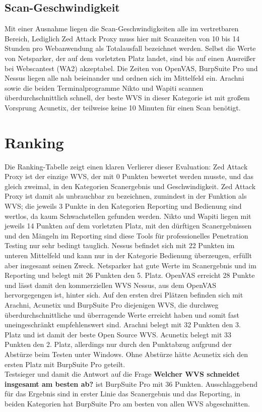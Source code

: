 \documentclass[12pt,oneside,a4paper,parskip]{scrbook}
\begin{document}
  \subsection{Scan-Geschwindigkeit}
  Mit einer Ausnahme liegen die Scan-Geschwindigkeiten alle im vertretbaren Bereich, Lediglich Zed Attack Proxy muss hier mit Scanzeiten von 10 bis 14 Stunden pro Webanwendung als Totalausfall bezeichnet werden. Selbst die Werte von Netsparker, der auf dem vorletzten Platz landet, sind bis auf einen Ausreißer bei Webscantest (WA2) akzeptabel. Die Zeiten von OpenVAS, BurpSuite Pro und Nessus liegen alle nah beieinander und ordnen sich im Mittelfeld ein. Arachni sowie die beiden Terminalprogramme Nikto und Wapiti scannen überdurchschnittlich schnell, der beste WVS in dieser Kategorie ist mit großem Vorsprung Acunetix, der teilweise keine 10 Minuten für einen Scan benötigt.
  \section{Ranking}
  Die Ranking-Tabelle zeigt einen klaren Verlierer dieser Evaluation: Zed Attack Proxy ist der einzige WVS, der mit 0 Punkten bewertet werden musste, und das gleich zweimal, in den Kategorien Scanergebnis und Geschwindigkeit. Zed Attack Proxy ist damit als unbrauchbar zu bezeichnen, zumindest in der Funktion als WVS; die jeweils 3 Punkte in den Kategorien Reporting und Bedienung sind wertlos, da kaum Schwachstellen gefunden werden. Nikto und Wapiti liegen mit jeweils 14 Punkten auf dem vorletzten Platz, mit den dürftigen Scanergebnissen und den Mängeln im Reporting sind diese Tools für professionelles Penetration Testing nur sehr bedingt tauglich. Nessus befindet sich mit 22 Punkten im unteren Mittelfeld und kann nur in der Kategorie Bedienung überzeugen, erfüllt aber insgesamt seinen Zweck. Netsparker hat gute Werte im Scanergebnis und im Reporting und belegt mit 26 Punkten den 5. Platz. OpenVAS erreicht 28 Punkte und lässt damit den kommerziellen WVS Nessus, aus dem OpenVAS hervorgegengen ist, hinter sich.
  Auf den ersten drei Plätzen befinden sich mit Arachni, Acunetix und BurpSuite Pro diejenigen WVS, die durchweg überdurchschnittliche und überragende Werte erreicht haben und somit fast uneingeschränkt empfehlenswert sind. Arachni belegt mit 32 Punkten den 3. Platz und ist damit der beste Open Source WVS.
  Acunetix belegt mit 33 Punkten den 2. Platz, allerdings nur durch den Punktabzug aufgrund der Abstürze beim Testen unter Windows. Ohne Abstürze hätte Acunetix sich den ersten Platz mit BurpSuite Pro geteilt.\\
  Testsieger und damit die Antwort auf die Frage \textbf{Welcher WVS schneidet insgesamt am besten ab?} ist BurpSuite Pro mit 36 Punkten. Ausschlaggebend für das Ergebnis sind in erster Linie das Scanergebnis und das Reporting, in beiden Kategorien hat BurpSuite Pro am besten von allen WVS abgeschnitten.
\end{document}
